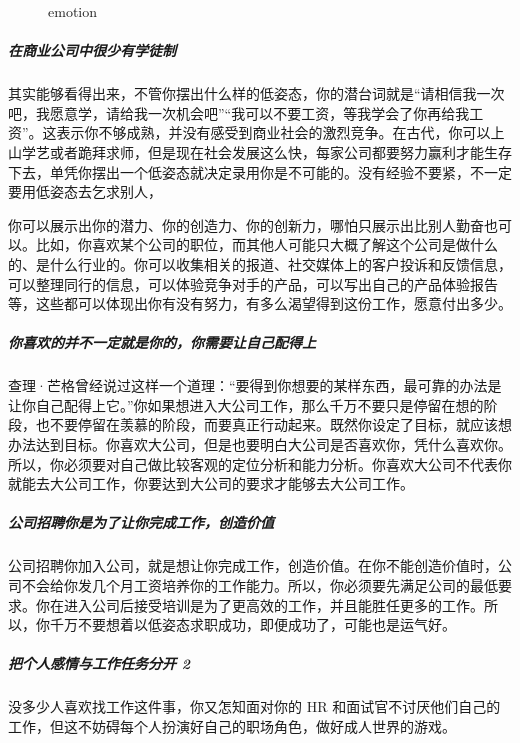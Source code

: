 \documentclass[letterpaper,10pt,english]{sphinxmanual}
\begin{document}
\begin{figure}[H]
\centering
\capstart

\noindent{}
\caption{emotion}\label{\detokenize{chapter_interview/xintai:id10}}\end{figure}


\subparagraph{在商业公司中很少有学徒制}
\label{\detokenize{chapter_interview/xintai:id3}}
其实能够看得出来，不管你摆出什么样的低姿态，你的潜台词就是“请相信我一次吧，我愿意学，请给我一次机会吧”“我可以不要工资，等我学会了你再给我工资”。这表示你不够成熟，并没有感受到商业社会的激烈竞争。在古代，你可以上山学艺或者跪拜求师，但是现在社会发展这么快，每家公司都要努力赢利才能生存下去，单凭你摆出一个低姿态就决定录用你是不可能的。没有经验不要紧，不一定要用低姿态去乞求别人，

你可以展示出你的潜力、你的创造力、你的创新力，哪怕只展示出比别人勤奋也可以。比如，你喜欢某个公司的职位，而其他人可能只大概了解这个公司是做什么的、是什么行业的。你可以收集相关的报道、社交媒体上的客户投诉和反馈信息，可以整理同行的信息，可以体验竞争对手的产品，可以写出自己的产品体验报告等，这些都可以体现出你有没有努力，有多么渴望得到这份工作，愿意付出多少。


\subparagraph{你喜欢的并不一定就是你的，你需要让自己配得上}
\label{\detokenize{chapter_interview/xintai:id4}}
查理·芒格曾经说过这样一个道理：“要得到你想要的某样东西，最可靠的办法是让你自己配得上它。”你如果想进入大公司工作，那么千万不要只是停留在想的阶段，也不要停留在羡慕的阶段，而要真正行动起来。既然你设定了目标，就应该想办法达到目标。你喜欢大公司，但是也要明白大公司是否喜欢你，凭什么喜欢你。所以，你必须要对自己做比较客观的定位分析和能力分析。你喜欢大公司不代表你就能去大公司工作，你要达到大公司的要求才能够去大公司工作。


\subparagraph{公司招聘你是为了让你完成工作，创造价值}
\label{\detokenize{chapter_interview/xintai:id5}}
公司招聘你加入公司，就是想让你完成工作，创造价值。在你不能创造价值时，公司不会给你发几个月工资培养你的工作能力。所以，你必须要先满足公司的最低要求。你在进入公司后接受培训是为了更高效的工作，并且能胜任更多的工作。所以，你千万不要想着以低姿态求职成功，即便成功了，可能也是运气好。


\subparagraph{把个人感情与工作任务分开 2\sphinxfootnotemark[828]}
\label{\detokenize{chapter_interview/xintai:id6}}%
\begin{footnotetext}[828]\sphinxAtStartFootnote
{}
%
\end{footnotetext}\ignorespaces 
没多少人喜欢找工作这件事，你又怎知面对你的 HR
和面试官不讨厌他们自己的工作，但这不妨碍每个人扮演好自己的职场角色，做好成人世界的游戏。
\end{document}
